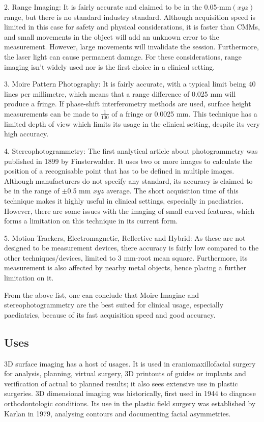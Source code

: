 \documentclass[11pt]{article}
\begin{document}
2. Range Imaging: It is fairly accurate and claimed to be in the 0.05-mm$(xyz)$ range, but there is no standard industry standard. Although acquisition speed is limited in this case for safety and physical considerations, it is faster than CMMs, and small movements in the object will add an unknown error to the measurement. However, large movements will invalidate the session. Furthermore, the laser light can cause permanent damage. For these considerations, range imaging isn't widely used nor is the first choice in a clinical setting.

3. Moire Pattern Photography: It is fairly accurate, with a typical limit being 40 lines per millimetre, which means that a range difference of 0.025 mm will produce a fringe. If phase-shift interferometry methods are used, surface height measurements can be made to $\frac{1}{100}$ of a fringe or 0.0025 mm. This technique has a limited depth of view which limits its usage in the clinical setting, despite its very high accuracy.

4. Stereophotogrammetry: The first analytical article about photogrammetry was published in 1899 by Finsterwalder. It uses two or more images to calculate the position of a recognisable point that has to be defined in multiple images. Although manufacturers do not specify any standard, its accuracy is claimed to be in the range of $\pm$0.5 mm $xyz$ average. The short acquisition time of this technique makes it highly useful in clinical settings, especially in paediatrics. However, there are some issues with the imaging of small curved features, which forms a limitation on this technique in its current form.

5. Motion Trackers, Electromagnetic, Reflective and Hybrid: As these are not designed to be measurement devices, there accuracy is fairly low compared to the other techniques/devices, limited to 3 mm-root mean square. Furthermore, its measurement is also affected by nearby metal objects, hence placing a further limitation on it.

From the above list, one can conclude that Moire Imagine and stereophotogrammetry are the best suited for clinical usage, especially paediatrics, because of its fast acquisition speed and good accuracy.

\subsection*{Uses}

3D surface imaging has a host of usages. It is used in craniomaxillofacial surgery for analysis, planning, virtual surgery, 3D printouts of guides or implants and verification of actual to planned results; it also sees extensive use in plastic surgeries. 3D dimensional imaging was historically, first used in 1944 to diagnose orthodontologic conditions. Its use in the plastic field surgery was established by Karlan in 1979, analysing contours and documenting facial asymmetries. 
\end{document}

